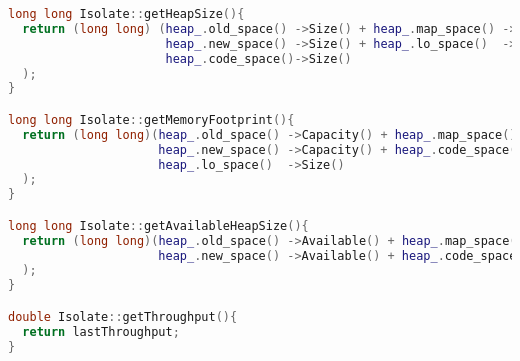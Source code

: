 \documentclass{l4proj}
\begin{document}
\begin{lstlisting}[language=cpp]
long long Isolate::getHeapSize(){
  return (long long) (heap_.old_space() ->Size() + heap_.map_space() ->Size() +
                      heap_.new_space() ->Size() + heap_.lo_space()  ->Size() +
                      heap_.code_space()->Size()
  );
}

long long Isolate::getMemoryFootprint(){
  return (long long)(heap_.old_space() ->Capacity() + heap_.map_space() ->Capacity() +
                     heap_.new_space() ->Capacity() + heap_.code_space()->Capacity() +
                     heap_.lo_space()  ->Size()
  );
}

long long Isolate::getAvailableHeapSize(){
  return (long long)(heap_.old_space() ->Available() + heap_.map_space() ->Available() +
                     heap_.new_space() ->Available() + heap_.code_space()->Available()
  );
}

double Isolate::getThroughput(){
  return lastThroughput;
}
\end{lstlisting}
\end{document}
